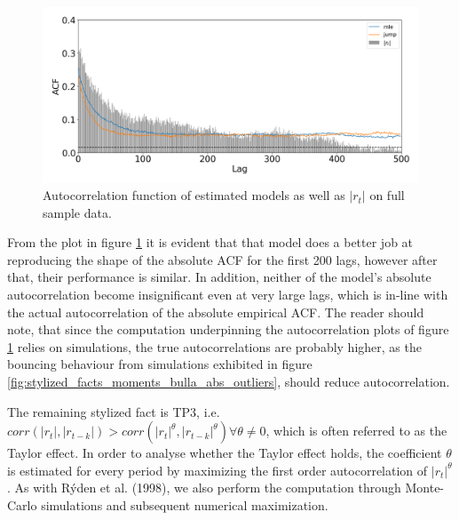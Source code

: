 \begin{figure}[H] 
    \centering
    \includegraphics[width=1.0\textwidth]{analysis/stylized_facts/images/acf_abs.png}
    \caption[Autocorrelation function of estimated models as well as $|r_t|$ on full sample data]{Autocorrelation function of estimated models as well as $|r_t|$ on full sample data.}
    \label{fig:stylized_facts_acf_plots} 
\end{figure}

From the plot in figure \ref{fig:stylized_facts_acf_plots} it is evident that that \mle model does a better job at reproducing the shape of the absolute ACF for the first 200 lags, however after that, their performance is similar. In addition, neither of the model's absolute autocorrelation become insignificant even at very large lags, which is in-line with the actual autocorrelation of the absolute empirical ACF. The reader should note, that since the computation underpinning the autocorrelation plots of figure \ref{fig:stylized_facts_acf_plots} relies on simulations, the true autocorrelations are probably higher, as the bouncing behaviour from simulations exhibited in figure \ref{fig:stylized_facts_moments_bulla_abs_outliers}, should reduce autocorrelation.

The remaining stylized fact is TP3, i.e. $corr(|r_t|, |r_{t-k}|) > corr(|r_t|^{\theta}, |r_{t-k}|^{\theta}) \forall \theta \neq 0$, which is often referred to as the Taylor effect. In order to analyse whether the Taylor effect holds, the coefficient $\theta$ is estimated for every period by maximizing the first order autocorrelation of $|r_t|^{\theta}$. As with Rýden et al. (1998), we also perform the computation through Monte-Carlo simulations and subsequent numerical maximization.

